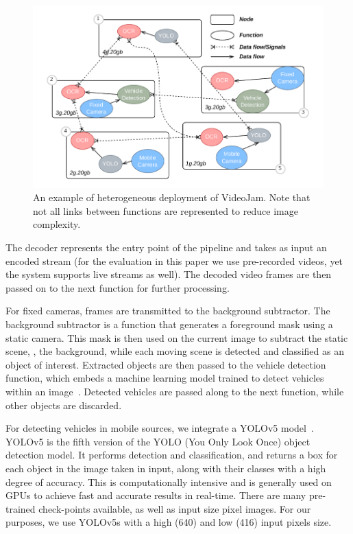 \begin{figure}
	\centering
	\includegraphics[width=\linewidth]{chapters/videojam/images/videojam_example_of_deployment.pdf}
	\caption{An example of heterogeneous deployment of VideoJam. Note that not all links between functions are represented to reduce image complexity.}
	\label{fig:example_deployment}
\end{figure}

The decoder represents the entry point of the pipeline and takes as input an encoded stream (for the evaluation in this paper we use pre-recorded videos, yet the system supports live streams as well). The decoded video frames are then passed on to the next function for further processing.

For fixed cameras, frames are transmitted to the background subtractor. The background subtractor is a function that generates a foreground mask using a static camera. This mask is then used on the current image to subtract the static scene, \ie, the background, while each moving scene is detected and classified as an object of interest. Extracted objects are then passed to the vehicle detection function, which embeds a machine learning model trained to detect vehicles within an image~\cite{vehicle_detection}. Detected vehicles are passed along to the next function, while other objects are discarded.

For detecting vehicles in mobile sources, we integrate a YOLOv5 model~\cite{jocher2020yolov5}. YOLOv5 is the fifth version of the YOLO (You Only Look Once) object detection model. It performs detection and classification, and returns a box for each object in the image taken in input, along with their classes with a high degree of accuracy. This is computationally intensive and is generally used on GPUs to achieve fast and accurate results in real-time. There are many pre-trained check-points available, as well as input size pixel images. For our purposes, we use YOLOv5s with a high (640) and low (416) input pixels size. 

